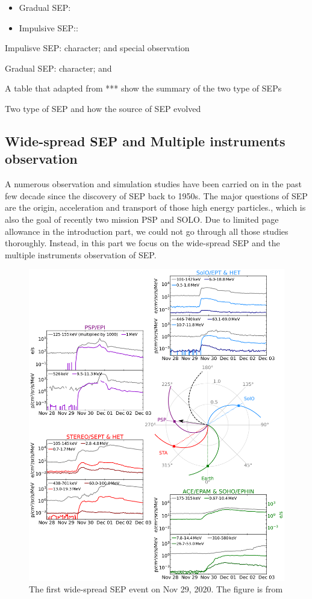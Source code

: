 \begin{itemize}
	\item Gradual SEP:
	\item Impulsive SEP::
\end{itemize}
Impulisve SEP: character; and special observation 

Gradual SEP: character; and 

A table that adapted from *** show the summary of the two type of SEPs

Two type of SEP and how the source of SEP evolved


\subsection{Wide-spread SEP and Multiple instruments observation}

A numerous observation and simulation studies have been carried on in the past few decade since the discovery of SEP back to 1950s. The major questions of SEP are the origin, acceleration and transport of those high energy particles.\cite{Desai2016_review}, which is also the goal of recently two mission PSP and SOLO. 
Due to limited page allowance in the introduction part, we could not go through all those studies thoroughly. Instead, in this part we focus on the wide-spread SEP and the multiple instruments observation of SEP.
\begin{figure}
	\centering
	\includegraphics[width = \textwidth]{images/2020-11-29_overview_plot.png}
	\caption{The first wide-spread \acl{SEP} event on Nov 29, 2020. The figure is from \citep{Kollhoff-2021}}
	\label{Fig:SEP_widespread}
\end{figure}

